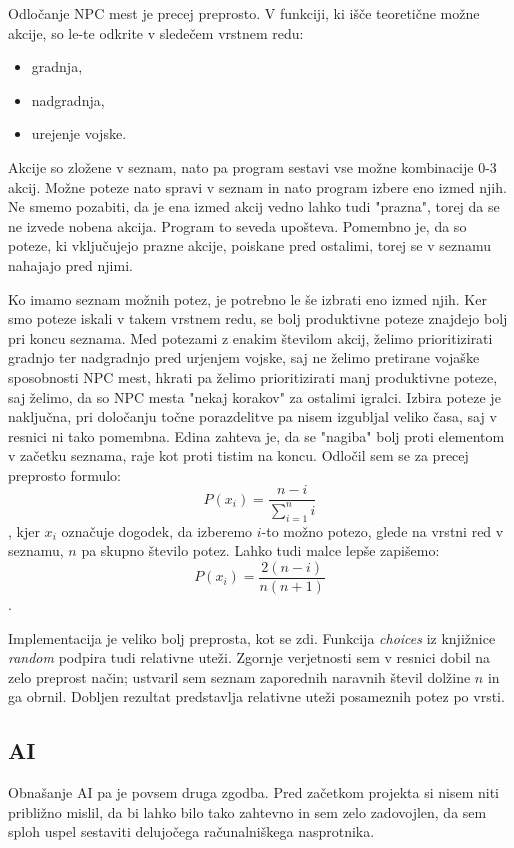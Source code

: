 \documentclass[a4paper, 16pt]{article}
\begin{document}
Odločanje NPC mest je precej preprosto. V funkciji, ki išče teoretične možne akcije, so le-te odkrite v sledečem vrstnem redu:

\begin{itemize}
    \item gradnja,
    \item nadgradnja,
    \item urejenje vojske.
\end{itemize}

Akcije so zložene v seznam, nato pa program sestavi vse možne kombinacije 0-3 akcij. Možne poteze nato spravi v seznam 
in nato program izbere eno izmed njih. Ne smemo pozabiti, da je ena izmed akcij vedno lahko tudi "prazna", torej da se ne izvede nobena akcija. Program 
to seveda upošteva. Pomembno je, da so poteze, ki vključujejo prazne akcije, poiskane pred ostalimi, torej se v seznamu nahajajo pred njimi. 

Ko imamo seznam možnih potez, je potrebno le še izbrati eno izmed njih. Ker smo poteze iskali v takem vrstnem redu, se bolj produktivne poteze znajdejo 
bolj pri koncu seznama. Med potezami z enakim številom akcij, želimo prioritizirati gradnjo ter nadgradnjo pred urjenjem vojske, saj ne želimo pretirane
vojaške sposobnosti NPC mest, hkrati pa želimo prioritizirati manj produktivne poteze, saj želimo, da so NPC mesta "nekaj korakov" za ostalimi igralci. 
Izbira poteze je naključna, pri določanju točne porazdelitve pa nisem izgubljal veliko časa, saj v resnici ni tako pomembna. Edina zahteva je, da se "nagiba" bolj proti 
elementom v začetku seznama, raje kot proti tistim na koncu. Odločil sem se za precej preprosto formulo:
$$P(x_i) = \frac{n-i}{\sum_{i=1}^n i}$$,
kjer $x_i$ označuje dogodek, da izberemo $i$-to možno potezo, glede na vrstni red v seznamu, $n$ pa skupno število potez. Lahko tudi malce lepše zapišemo:
$$ P(x_i) = \frac{2(n-i)}{n(n+1)} $$.

Implementacija je veliko bolj preprosta, kot se zdi. Funkcija \textit{choices} iz knjižnice \textit{random} podpira tudi relativne uteži. Zgornje verjetnosti sem v resnici dobil na zelo preprost način;
ustvaril sem seznam zaporednih naravnih števil dolžine $n$ in ga obrnil. Dobljen rezultat predstavlja relativne uteži posameznih potez po vrsti.

\subsection{AI}

Obnašanje AI pa je povsem druga zgodba. Pred začetkom projekta si nisem niti približno mislil, da bi lahko bilo tako zahtevno in sem zelo zadovojlen, da sem sploh uspel sestaviti delujočega 
računalniškega nasprotnika. 
\end{document}
